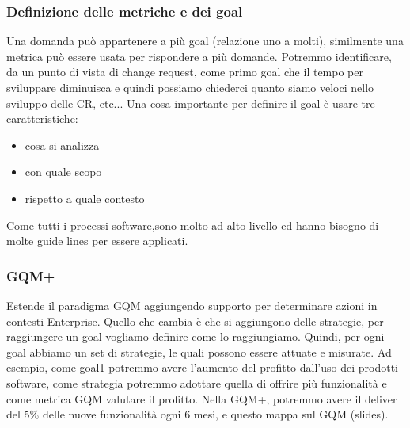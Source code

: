 \documentclass{article}
\begin{document}
\subsubsection{Definizione delle metriche e dei goal}
Una domanda può appartenere a più goal (relazione uno a molti), similmente una metrica può essere usata per rispondere a più domande. Potremmo identificare, da un punto di vista di change request, come primo goal che il tempo per sviluppare diminuisca e quindi possiamo chiederci quanto siamo veloci nello sviluppo delle CR, etc... Una cosa importante per definire il goal è usare tre caratteristiche:
\begin{itemize}
\item cosa si analizza 
\item con quale scopo
\item rispetto a quale contesto
\end{itemize}
Come tutti i processi software,sono molto ad alto livello ed hanno bisogno di molte guide lines per essere applicati.
\subsubsection{GQM+}
Estende il paradigma GQM aggiungendo supporto per determinare azioni in contesti Enterprise. Quello che cambia è che si aggiungono delle strategie, per raggiungere un goal vogliamo definire come lo raggiungiamo. Quindi, per ogni goal abbiamo un set di strategie, le quali possono essere attuate e misurate. Ad esempio, come goal1 potremmo avere l'aumento del profitto dall'uso dei prodotti software, come strategia potremmo adottare quella di offrire più funzionalità e come metrica GQM valutare il profitto. Nella GQM+, potremmo avere il deliver del 5\% delle nuove funzionalità ogni 6 mesi, e questo mappa sul GQM (slides).
\end{document}
